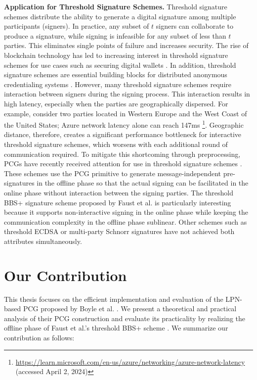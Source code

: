 \textbf{Application for Threshold Signature Schemes.}  Threshold signature schemes \cite{desmedt1987society, desmedt1992threshold} distribute the ability to generate a digital signature among multiple participants (signers). In practice, any subset of $t$ signers can collaborate to produce a signature, while signing is infeasible for any subset of less than $t$ parties. This eliminates single points of failure and increases security. The rise of blockchain technology has led to increasing interest in threshold signature schemes for use cases such as securing digital wallets \cite{gennaro2016threshold}. In addition, threshold signature schemes are essential building blocks for distributed anonymous credentialing systems \cite{garman2013decentralized}. However, many threshold signature schemes require interaction between signers during the signing process. This interaction results in high latency, especially when the parties are geographically dispersed. For example, consider two parties located in Western Europe and the West Coast of the United States; Azure network latency alone can reach 147ms \footnote{\url{https://learn.microsoft.com/en-us/azure/networking/azure-network-latency} (accessed April 2, 2024)}. Geographic distance, therefore, creates a significant performance bottleneck for interactive threshold signature schemes, which worsens with each additional round of communication required. To mitigate this shortcoming through preprocessing, PCGs have recently received attention for use in threshold signature schemes \cite{abram2022low, faust2023non}. These schemes use the PCG primitive to generate message-independent pre-signatures in the offline phase so that the actual signing can be facilitated in the online phase without interaction between the signing parties. The threshold BBS+ signature scheme proposed by Faust et al. \cite{faust2023non} is particularly interesting because it supports non-interactive signing in the online phase while keeping the communication complexity in the offline phase sublinear. Other schemes such as threshold ECDSA \cite{abram2022low} or multi-party Schnorr signatures \cite{kondi2023two} have not achieved both attributes simultaneously. 

\section{Our Contribution}
This thesis focuses on the efficient implementation and evaluation of the LPN-based PCG proposed by Boyle et al. \cite{boyle2020efficient}. We present a theoretical and practical analysis of their PCG construction and evaluate its practicality by realizing the offline phase of Faust et al.'s threshold BBS+ scheme \cite{faust2023non}. We summarize our contribution as follows:

